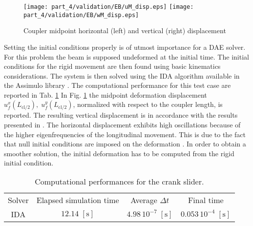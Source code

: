 \begin{figure}[tb]
	\centering
	\texttt{[image: part\_4/validation/EB/uM\_disp.eps]} 
	\texttt{[image: part\_4/validation/EB/wM\_disp.eps]} 
	\caption{Coupler midpoint horizontal (left) and vertical (right) displacement}
	\label{fig:defM_crsl}
\end{figure}

Setting the initial conditions properly is of utmost  importance for a DAE solver. For this problem the beam is supposed undeformed at the initial time. The initial conditions for the rigid movement are then found using basic kinematics considerations.  The system is then solved using the IDA algorithm available in the Assimulo library \cite{assimulo2015}. The computational performance for this test case are reported in Tab. \ref{tab:comp_perf_crslider} In Fig. \ref{fig:defM_crsl} the midpoint deformation displacement $u_f^x(L_{\text{cl}/2}),\; u_f^y(L_{\text{cl}/2})$, normalized with respect to the coupler length, is reported. The resulting vertical displacement is in accordance with the results presented in \cite{ellenbroek2018}. The horizontal displacement exhibits high oscillations because of the higher eigenfrequencies of the longitudinal movement. This is due to the fact that null initial conditions are imposed on the deformation \cite{simeon2006}. In order to obtain a smoother solution, the initial deformation has to be computed from the rigid initial condition.


\begin{table}[tb]
	\centering
	\caption{{Computational performances for the crank slider.}}
	\label{tab:comp_perf_crslider}       %
	\begin{tabular}{cccc}
		\hline\noalign{\smallskip}
		Solver & Elapsed simulation time & Average $\Delta t$ & Final time \\
		\noalign{\smallskip}\hline\noalign{\smallskip}
		IDA & $12.14\; \mathrm{[s]}$ & $4.98 \, 10^{-7} \; \mathrm{[s]}$ & $0.053 \, 10^{-4} \; \mathrm{[s]}$\\
		\hline
	\end{tabular}
\end{table}

